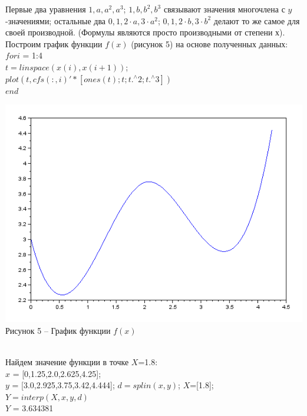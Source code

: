 \documentclass[russian, utf8, nocolumnxxxi, nocolumnxxxii, 14pt]{eskdtext}
\begin{document}
\indent Первые два уравнения $1,a,a^2,a^3$; $1,b,b^2,b^3$ связывают значения многочлена с $y$-значениями; остальные два $0,1,2 \cdot a,3 \cdot a^2$; $0,1,2 \cdot b,3 \cdot b^2$ делают то же самое для своей производной. (Формулы являются просто производными от степени х). \\
Построим график функции $f(x)$ (рисунок 5) на основе полученных данных: \\
$for i$ = 1:4\\
    $t = linspace(x(i),x(i+1))$; \\
    $plot(t,cfs(:,i)'*[ones(t); t; t.^{\wedge}2; t.^{\wedge}3])$ \\
$end$ \\
\begin{center}
\includegraphics[scale=0.8]{JPG/funf.png}\\
Рисунок 5 -- График функции $f(x)$\\
\end{center}\\
\indent Найдем значение функции в точке $X$=1.8:\\
$x$ = [0,1.25,2.0,2.625,4.25]; \\
$y$ = [3.0,2.925,3.75,3.42,4.444];
$d = splin(x,y)$;
$X$=[1.8];\\
$Y=interp(X,x,y,d)$\\
$Y$  = 3.634381\\
\end{document}
